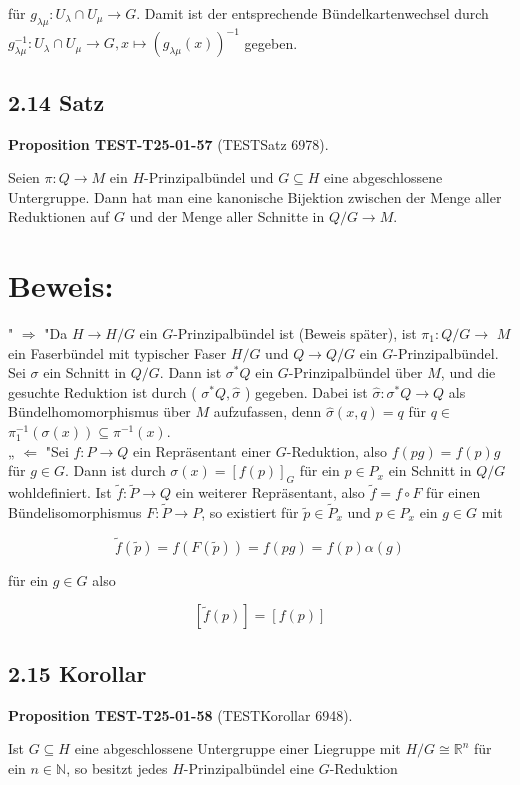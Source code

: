 \documentclass[10pt, letterpaper]{article}
\newcommand{\CustomHeading}[3]{%
  \par\medskip\noindent%
  \textbf{#1 #2} \textnormal{(#3)}.\enskip%
}
\newenvironment{PROP}[2]{\begin{unitbox}\CustomHeading{Proposition}{#1}{#2}}{\end{unitbox}}
\begin{document}
für $g_{\lambda \mu}: U_{\lambda} \cap U_{\mu} \rightarrow G$. Damit ist der entsprechende Bündelkartenwechsel durch $g_{\lambda \mu}^{-1}: U_{\lambda} \cap U_{\mu} \rightarrow G, x \mapsto\left(g_{\lambda \mu}(x)\right)^{-1}$ gegeben.

\subsection*{2.14 Satz}
\begin{PROP}{TEST-T25-01-57}{TESTSatz 6978}
Seien $\pi: Q \rightarrow M$ ein $H$-Prinzipalbündel und $G \subseteq H$ eine abgeschlossene Untergruppe. Dann hat man eine kanonische Bijektion zwischen der Menge aller Reduktionen auf $G$ und der Menge aller Schnitte in $Q / G \rightarrow M$.
\end{PROP}

\section*{Beweis:}
" $\Rightarrow$ "Da $H \rightarrow H / G$ ein $G$-Prinzipalbündel ist (Beweis später), ist $\pi_{1}: Q / G \rightarrow$ $M$ ein Faserbündel mit typischer Faser $H / G$ und $Q \rightarrow Q / G$ ein $G$-Prinzipalbündel. Sei $\sigma$ ein Schnitt in $Q / G$. Dann ist $\sigma^{*} Q$ ein $G$-Prinzipalbündel über $M$, und die gesuchte Reduktion ist durch ( $\sigma^{*} Q, \hat{\sigma}$ ) gegeben. Dabei ist $\hat{\sigma}: \sigma^{*} Q \rightarrow Q$ als Bündelhomomorphismus über $M$ aufzufassen, denn $\hat{\sigma}(x, q)=q$ für $q \in$ $\pi_{1}^{-1}(\sigma(x)) \subseteq \pi^{-1}(x)$.\\
„ $\Leftarrow$ "Sei $f: P \rightarrow Q$ ein Repräsentant einer $G$-Reduktion, also $f(p g)=f(p) g$ für $g \in G$. Dann ist durch $\sigma(x)=[f(p)]_{G}$ für ein $p \in P_{x}$ ein Schnitt in $Q / G$ wohldefiniert. Ist $\tilde{f}: \tilde{P} \rightarrow Q$ ein weiterer Repräsentant, also $\tilde{f}=f \circ F$ für einen Bündelisomorphismus $F: \tilde{P} \rightarrow P$, so existiert für $\tilde{p} \in \tilde{P}_{x}$ und $p \in P_{x}$ ein $g \in G$ mit

$$
\tilde{f}(\tilde{p})=f(F(\tilde{p}))=f(p g)=f(p) \alpha(g)
$$

für ein $g \in G$ also

$$
[\tilde{f}(p)]=[f(p)]
$$

\subsection*{2.15 Korollar}
\begin{PROP}{TEST-T25-01-58}{TESTKorollar 6948}
Ist $G \subseteq H$ eine abgeschlossene Untergruppe einer Liegruppe mit $H / G \cong \mathbb{R}^{n}$ für ein $n \in \mathbb{N}$, so besitzt jedes $H$-Prinzipalbündel eine $G$-Reduktion
\end{PROP}
\end{document}
